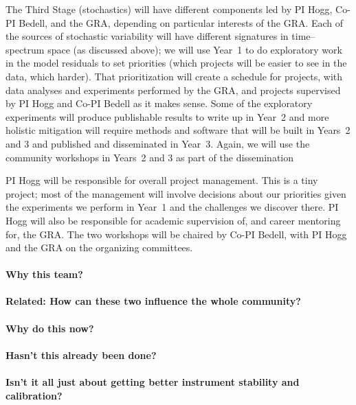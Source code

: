 \documentclass[12pt, letterpaper]{article}
\begin{document}
The Third Stage (stochastics) will have different components led by PI
Hogg, Co-PI Bedell, and the GRA, depending on particular interests of
the GRA.
Each of the sources of stochastic variability will have different
signatures in time--spectrum space (as discussed above); we will use
Year~1 to do exploratory work in the model residuals to set priorities
(which projects will be easier to see in the data, which harder).
That prioritization will create a schedule for projects, with data
analyses and experiments performed by the GRA, and projects supervised
by PI Hogg and Co-PI Bedell as it makes sense.
Some of the exploratory experiments will produce publishable results
to write up in Year~2 and more holistic mitigation will require
methods and software that will be built in Years~2 and 3 and published
and disseminated in Year~3.
Again, we will use the community workshops in Years~2 and 3 as part of
the dissemination

PI Hogg will be responsible for overall project management. This is a
tiny project; most of the management will involve decisions about our
priorities given the experiments we perform in Year~1 and the
challenges we discover there.
PI Hogg will also be responsible for academic supervision of, and
career mentoring for, the GRA.
The two workshops will be chaired by Co-PI Bedell, with PI Hogg and
the GRA on the organizing committees.



\paragraph{Why this team?}

\paragraph{Related: How can these two influence the whole community?}

\paragraph{Why do this now?}

\paragraph{Hasn't this already been done?}

\paragraph{Isn't it all just about getting better instrument stability and calibration?}
\end{document}
